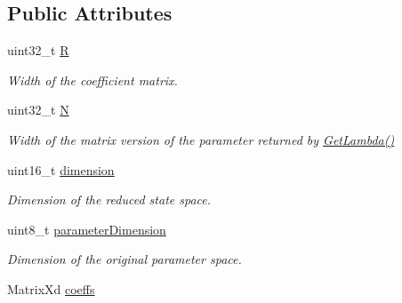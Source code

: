 \subsection*{Public Attributes}
\begin{DoxyCompactItemize}
\item 
\hypertarget{struct_d_r_d_s_p_1_1_affine_parameter_map_a7c4c0f072f5248a9c5cf65b813fcb836}{uint32\-\_\-t \hyperlink{struct_d_r_d_s_p_1_1_affine_parameter_map_a7c4c0f072f5248a9c5cf65b813fcb836}{R}}\label{struct_d_r_d_s_p_1_1_affine_parameter_map_a7c4c0f072f5248a9c5cf65b813fcb836}

\begin{DoxyCompactList}\small\item\em Width of the coefficient matrix. \end{DoxyCompactList}\item 
\hypertarget{struct_d_r_d_s_p_1_1_affine_parameter_map_a5f12477a00c6f104a97b240cb5a81295}{uint32\-\_\-t \hyperlink{struct_d_r_d_s_p_1_1_affine_parameter_map_a5f12477a00c6f104a97b240cb5a81295}{N}}\label{struct_d_r_d_s_p_1_1_affine_parameter_map_a5f12477a00c6f104a97b240cb5a81295}

\begin{DoxyCompactList}\small\item\em Width of the matrix version of the parameter returned by \hyperlink{struct_d_r_d_s_p_1_1_affine_parameter_map_ae983bda2073bac0d8e6aebcc34d51153}{Get\-Lambda()} \end{DoxyCompactList}\item 
\hypertarget{struct_d_r_d_s_p_1_1_affine_parameter_map_aed859f95d6b7ea0850f84242df5379ab}{uint16\-\_\-t \hyperlink{struct_d_r_d_s_p_1_1_affine_parameter_map_aed859f95d6b7ea0850f84242df5379ab}{dimension}}\label{struct_d_r_d_s_p_1_1_affine_parameter_map_aed859f95d6b7ea0850f84242df5379ab}

\begin{DoxyCompactList}\small\item\em Dimension of the reduced state space. \end{DoxyCompactList}\item 
\hypertarget{struct_d_r_d_s_p_1_1_affine_parameter_map_a210acc8ae8c11b4b2c9360e42ccafb00}{uint8\-\_\-t \hyperlink{struct_d_r_d_s_p_1_1_affine_parameter_map_a210acc8ae8c11b4b2c9360e42ccafb00}{parameter\-Dimension}}\label{struct_d_r_d_s_p_1_1_affine_parameter_map_a210acc8ae8c11b4b2c9360e42ccafb00}

\begin{DoxyCompactList}\small\item\em Dimension of the original parameter space. \end{DoxyCompactList}\item 
\hypertarget{struct_d_r_d_s_p_1_1_affine_parameter_map_a760993390cbbec42011c1e1e76a44660}{Matrix\-Xd \hyperlink{struct_d_r_d_s_p_1_1_affine_parameter_map_a760993390cbbec42011c1e1e76a44660}{coeffs}}\label{struct_d_r_d_s_p_1_1_affine_parameter_map_a760993390cbbec42011c1e1e76a44660}


\end{DoxyCompactItemize}
